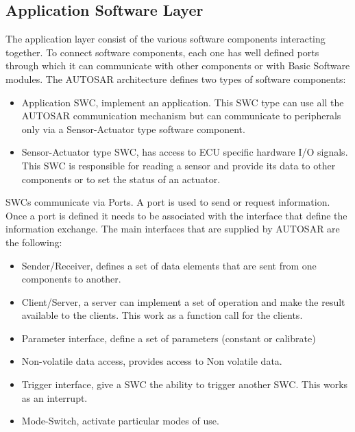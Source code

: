 \documentclass[../main.tex]{subfiles}
\begin{document}
\subsection{Application Software Layer}
The application layer consist of the various software components interacting together. To connect software components, each one has well defined ports through which it can communicate with other components or with Basic Software modules. The \gls{AUTOSAR} architecture defines two types of software components:
\begin{itemize}
    \item Application \gls{SWC}, implement an application. This \gls{SWC} type can use all the \gls{AUTOSAR} communication mechanism but can communicate to peripherals only via a Sensor-Actuator type software component. 
    \item Sensor-Actuator type \gls{SWC}, has access to \gls{ECU} specific hardware \gls{I/O} signals. This \gls{SWC} is responsible for reading a sensor and provide its data to other components or to set the status of an actuator. 
\end{itemize}
\gls{SWC}s communicate via Ports. A port is used to send or request information. Once a port is defined it needs to be associated with the interface that define the information exchange. The main interfaces that are supplied by \gls{AUTOSAR} are the following:
\begin{itemize}
    \item Sender/Receiver, defines a set of data elements that are sent from one components to another. 
    \item Client/Server, a server can implement a set of operation and make the result available to the clients. This work as a function call for the clients. 
    \item Parameter interface, define a set of parameters (constant or calibrate)
    \item Non-volatile data access, provides access to Non volatile data. 
    \item Trigger interface, give a \gls{SWC} the ability to trigger another \gls{SWC}. This works as an interrupt. 
    \item Mode-Switch, activate particular modes of use. 
\end{itemize}
\end{document}
